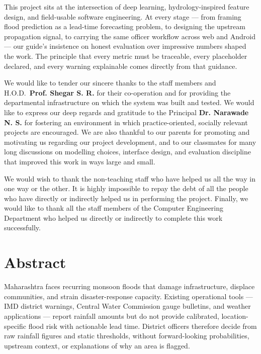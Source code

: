 \documentclass[a4paper,12pt]{report}
\begin{document}
This project sits at the intersection of deep learning, hydrology-inspired feature design, and field-usable software engineering. At every stage --- from framing flood prediction as a lead-time forecasting problem, to designing the upstream propagation signal, to carrying the same officer workflow across web and Android --- our guide's insistence on honest evaluation over impressive numbers shaped the work. The principle that every metric must be traceable, every placeholder declared, and every warning explainable comes directly from that guidance.

We would like to tender our sincere thanks to the staff members and H.O.D.\ \textbf{Prof. Shegar S. R.} for their co-operation and for providing the departmental infrastructure on which the system was built and tested. We would like to express our deep regards and gratitude to the Principal \textbf{Dr. Narawade N. S.} for fostering an environment in which practice-oriented, socially relevant projects are encouraged. We are also thankful to our parents for promoting and motivating us regarding our project development, and to our classmates for many long discussions on modelling choices, interface design, and evaluation discipline that improved this work in ways large and small.

We would wish to thank the non-teaching staff who have helped us all the way in one way or the other. It is highly impossible to repay the debt of all the people who have directly or indirectly helped us in performing the project. Finally, we would like to thank all the staff members of the Computer Engineering Department who helped us directly or indirectly to complete this work successfully.

\chapter*{Abstract}
Maharashtra faces recurring monsoon floods that damage infrastructure, displace communities, and strain disaster-response capacity. Existing operational tools --- IMD district warnings, Central Water Commission gauge bulletins, and weather applications --- report rainfall amounts but do not provide calibrated, location-specific flood risk with actionable lead time. District officers therefore decide from raw rainfall figures and static thresholds, without forward-looking probabilities, upstream context, or explanations of why an area is flagged.
\end{document}
